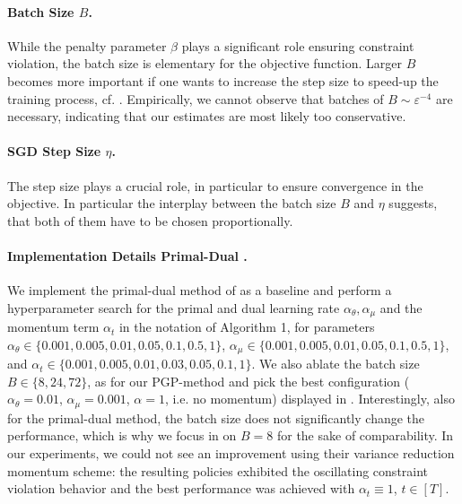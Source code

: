 \documentclass{article}
\theoremstyle{plain}
\theoremstyle{definition}
\theoremstyle{remark}
\def\epsilon{{\varepsilon}}
\newcommand{\setm}[1]{[#1]}
\begin{document}
\paragraph{Batch Size $B$.} While the penalty parameter $\beta$ plays a significant role ensuring
constraint violation, the batch size is elementary for the objective
function. Larger $B$ becomes more important if one wants to increase the
step size to speed-up the training process, cf.
. Empirically, we
cannot observe that batches of $B \sim \epsilon^{-4}$ are necessary,
indicating that our estimates are most likely too conservative.

\paragraph{SGD Step Size $\eta$.}
The step size plays a crucial role, in particular to ensure convergence in
the objective. In particular the interplay between the batch size $B$ and
$\eta$ suggests, that both of them have to be chosen proportionally.

\paragraph{Implementation Details Primal-Dual \cite{yingPolicybasedPrimalDualMethods2025}.}
We implement the primal-dual method of \citet{yingPolicybasedPrimalDualMethods2025} as a baseline
and perform a hyperparameter search for the primal and dual learning rate
$\alpha_\theta, \alpha_\mu$ and the momentum term $\alpha_t$
in the notation
of \citet{yingPolicybasedPrimalDualMethods2025} Algorithm 1,
for parameters
$\alpha_\theta \in \{0.001, 0.005, 0.01, 0.05,0.1, 0.5, 1\}$,
$\alpha_\mu \in \{0.001, 0.005, 0.01, 0.05,0.1, 0.5, 1\}$, and
$\alpha_t \in \{0.001, 0.005, 0.01, 0.03, 0.05, 0.1, 1\}$.
We also ablate the batch size $B \in \{8, 24, 72\}$,
as for our PGP-method and pick the best configuration ($\alpha_\theta =
 0.01$, $\alpha_\mu= 0.001$, $\alpha = 1$, i.e. no momentum) displayed in
.
Interestingly, also for the primal-dual method, the batch size does not
significantly change the performance, which is why we focus in
 on $B=8$
for the sake of comparability. In our experiments, we could not see an
improvement using their variance reduction momentum scheme:
the resulting policies exhibited the oscillating constraint violation
behavior and the best performance was achieved
with $\alpha_t \equiv 1$, $t \in \setm{T}$.
\end{document}
